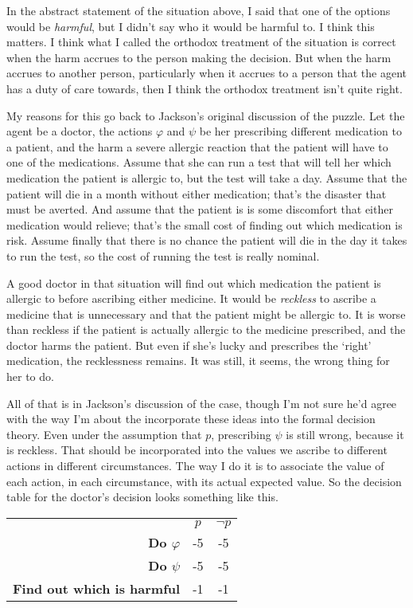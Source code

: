 In the abstract statement of the situation above, I said that one of the options would be \textit{harmful}, but I didn't say who it would be harmful to. I think this matters. I think what I called the orthodox treatment of the situation is correct when the harm accrues to the person making the decision. But when the harm accrues to another person, particularly when it accrues to a person that the agent has a duty of care towards, then I think the orthodox treatment isn't quite right.

My reasons for this go back to Jackson's original discussion of the puzzle. Let the agent be a doctor, the actions \(\varphi\) and \(\psi\) be her prescribing different medication to a patient, and the harm a severe allergic reaction that the patient will have to one of the medications. Assume that she can run a test that will tell her which medication the patient is allergic to, but the test will take a day. Assume that the patient will die in a month without either medication; that's the disaster that must be averted. And assume that the patient is is some discomfort that either medication would relieve; that's the small cost of finding out which medication is risk. Assume finally that there is no chance the patient will die in the day it takes to run the test, so the cost of running the test is really nominal.

A good doctor in that situation will find out which medication the patient is allergic to before ascribing either medicine. It would be \textit{reckless} to ascribe a medicine that is unnecessary and that the patient might be allergic to. It is worse than reckless if the patient is actually allergic to the medicine prescribed, and the doctor harms the patient. But even if she's lucky and prescribes the `right' medication, the recklessness remains. It was still, it seems, the wrong thing for her to do.

All of that is in Jackson's discussion of the case, though I'm not sure he'd agree with the way I'm about the incorporate these ideas into the formal decision theory. Even under the assumption that \(p\), prescribing \(\psi\) is still wrong, because it is reckless. That should be incorporated into the values we ascribe to different actions in different circumstances. The way I do it is to associate the value of each action, in each circumstance, with its actual expected value. So the decision table for the doctor's decision looks something like this.

\begin{center}
\begin{tabular}{r c c}
 & \(p\) & \(\neg p\) \\
\textbf{Do \(\varphi\)} & -5 & -5 \\
\textbf{Do \(\psi\)} & -5 & -5 \\
\textbf{Find out which is harmful} & -1 & -1 \\
\end{tabular}
\end{center}

